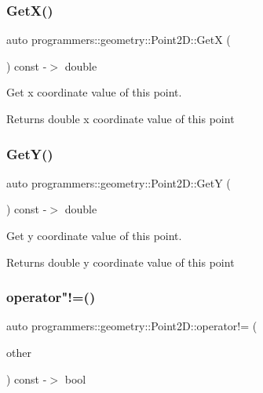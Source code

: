 \subsubsection{\texorpdfstring{Get\+X()}{GetX()}}
{\footnotesize\ttfamily auto programmers\+::geometry\+::\+Point2\+D\+::\+GetX (\begin{DoxyParamCaption}{ }\end{DoxyParamCaption}) const -\/$>$  double}



Get x coordinate value of this point. 

\begin{DoxyReturn}{Returns}
double x coordinate value of this point 
\end{DoxyReturn}
\mbox{\label{classprogrammers_1_1geometry_1_1Point2D_a28ade425318accb547519a066342dd47}} 
\subsubsection{\texorpdfstring{Get\+Y()}{GetY()}}
{\footnotesize\ttfamily auto programmers\+::geometry\+::\+Point2\+D\+::\+GetY (\begin{DoxyParamCaption}{ }\end{DoxyParamCaption}) const -\/$>$  double}



Get y coordinate value of this point. 

\begin{DoxyReturn}{Returns}
double y coordinate value of this point 
\end{DoxyReturn}
\mbox{\label{classprogrammers_1_1geometry_1_1Point2D_a14191b6d9b9b360390a36363c7d3569e}} 
\subsubsection{\texorpdfstring{operator"!=()}{operator!=()}}
{\footnotesize\ttfamily auto programmers\+::geometry\+::\+Point2\+D\+::operator!= (\begin{DoxyParamCaption}\item[{const \hyperlink{classprogrammers_1_1geometry_1_1Point2D}{Point2D} \&}]{other }\end{DoxyParamCaption}) const -\/$>$  bool}



